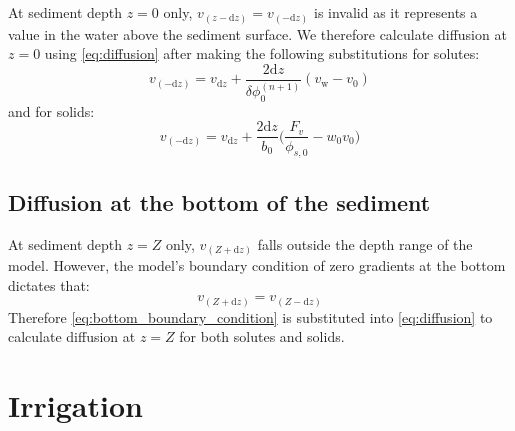 \documentclass[a4paper]{article}
\newcommand{\D}[1]{\mathrm{d}#1}
\begin{document}
At sediment depth $z = 0$ only, $v_{(z-\D{z})} = v_{(-\D{z})}$ is invalid as it represents a value in the water above the sediment surface. We therefore calculate diffusion at $z = 0$ using \eqref{eq:diffusion} after making the following substitutions for solutes:
\begin{equation}\label{Dv0}
v_{(-\D{z})} = v_{\D{z}} + \frac{2 \D{z}}{\delta \phi_0^{(n+1)}} (v_\mathrm{w} - v_0)
\end{equation}
and for solids:
\begin{equation}
v_{(-\D{z})} = v_{\D{z}} + \frac{2 \D{z}}{b_0} \Bigg( \frac{F_v}{\phi_{s, 0}} - w_0 v_0 \Bigg)
\end{equation}

\subsection{Diffusion at the bottom of the sediment}\label{sx:diffusion_bottom}

At sediment depth $z = Z$ only, $v_{(Z+\D{z})}$ falls outside the depth range of the model. However, the model's boundary condition of zero gradients at the bottom dictates that:
\begin{equation}\label{eq:bottom_boundary_condition}
v_{(Z+\D{z})} = v_{(Z-\D{z})}
\end{equation}
Therefore \eqref{eq:bottom_boundary_condition} is substituted into \eqref{eq:diffusion} to calculate diffusion at $z = Z$ for both solutes and solids.


\section{Irrigation}\label{sx:irrigation}
\end{document}
